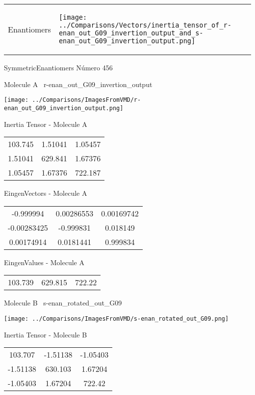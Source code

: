\vtab[-5mm]
\begin{tabular}{*{2}{m{}}}
\begin{center}
\textcolor{NavyBlue}{\Large Enantiomers}
\end{center}
&
\begin{center}
\texttt{[image: ../Comparisons/Vectors/inertia\_tensor\_of\_r-enan\_out\_G09\_invertion\_output\_and\_s-enan\_out\_G09\_invertion\_output.png]}
\end{center}
\end{tabular}

 \newpage

\vtab[-3cm]
\begin{center}
{\large SymmetricEnantiomers \tab Número 456}
\end{center}
\begin{multicols}{2}
\begin{center}

Molecule A \
r-enan\_out\_G09\_invertion\_output

\texttt{[image: ../Comparisons/ImagesFromVMD/r-enan\_out\_G09\_invertion\_output.png]}

Inertia Tensor - Molecule A \\
\begin{tabular}{|c c c|}
103.745	 & 	1.51041	 & 	1.05457	 \\
1.51041	 & 	629.841	 & 	1.67376	 \\
1.05457	 & 	1.67376	 & 	722.187
\end{tabular}

\vtab
 EingenVectors - Molecule A     \\
\begin{tabular}{|c c c|}
-0.999994	 & 	0.00286553	 & 	0.00169742	 \\
-0.00283425	 & 	-0.999831	 & 	0.018149	 \\
0.00174914	 & 	0.0181441	 & 	0.999834
\end{tabular}

\vtab
 EingenValues - Molecule A     \\
\begin{tabular}{|c c c|}
103.739	 & 	629.815	 & 	722.22	 \\
\end{tabular}
\columnbreak

Molecule B \
s-enan\_rotated\_out\_G09

\texttt{[image: ../Comparisons/ImagesFromVMD/s-enan\_rotated\_out\_G09.png]}

Inertia Tensor - Molecule B \\
\begin{tabular}{|c c c|}
103.707	 & 	-1.51138	 & 	-1.05403	 \\
-1.51138	 & 	630.103	 & 	1.67204	 \\
-1.05403	 & 	1.67204	 & 	722.42
\end{tabular}


\end{center}
\end{multicols}

